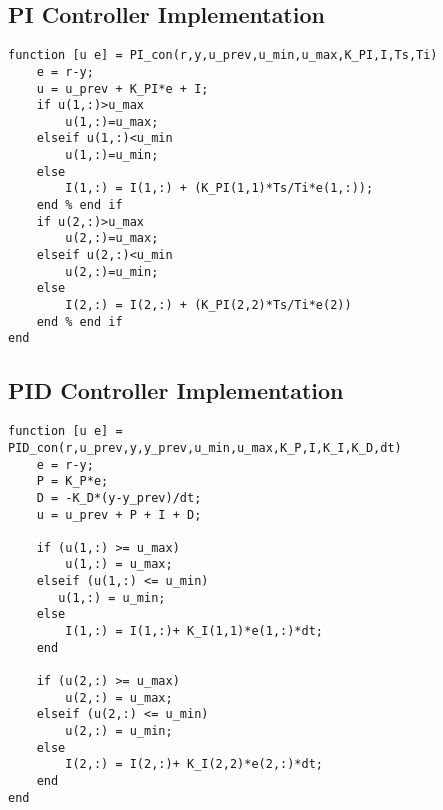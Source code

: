 \begin{bilag}
\begin{appendices}
\subsection{PI Controller Implementation}
\label{app:PI_con}
\begin{lstlisting}[breaklines]
function [u e] = PI_con(r,y,u_prev,u_min,u_max,K_PI,I,Ts,Ti)
    e = r-y;
    u = u_prev + K_PI*e + I;
    if u(1,:)>u_max
        u(1,:)=u_max;
    elseif u(1,:)<u_min
        u(1,:)=u_min;
    else
        I(1,:) = I(1,:) + (K_PI(1,1)*Ts/Ti*e(1,:));
    end % end if
    if u(2,:)>u_max
        u(2,:)=u_max;
    elseif u(2,:)<u_min
        u(2,:)=u_min;
    else
        I(2,:) = I(2,:) + (K_PI(2,2)*Ts/Ti*e(2))
    end % end if
end
\end{lstlisting}

\subsection{PID Controller Implementation}
\label{app:PID_con}
\begin{lstlisting}[breaklines]
function [u e] = PID_con(r,u_prev,y,y_prev,u_min,u_max,K_P,I,K_I,K_D,dt)
    e = r-y;
    P = K_P*e;
    D = -K_D*(y-y_prev)/dt;
    u = u_prev + P + I + D;
    
    if (u(1,:) >= u_max)
        u(1,:) = u_max;
    elseif (u(1,:) <= u_min)
       u(1,:) = u_min;
    else
        I(1,:) = I(1,:)+ K_I(1,1)*e(1,:)*dt;
    end
    
    if (u(2,:) >= u_max)
        u(2,:) = u_max;
    elseif (u(2,:) <= u_min)
        u(2,:) = u_min;
    else
        I(2,:) = I(2,:)+ K_I(2,2)*e(2,:)*dt;
    end
end
\end{lstlisting}
\end{appendices}
\end{bilag}